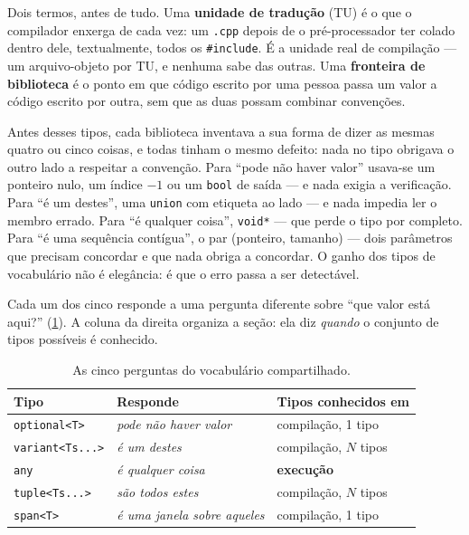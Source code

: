 Dois termos, antes de tudo. Uma \textbf{unidade de tradução} (TU) é o que o
compilador enxerga de cada vez: um \texttt{.cpp} depois de o pré-processador ter
colado dentro dele, textualmente, todos os \texttt{\#include}. É a unidade real
de compilação --- um arquivo-objeto por TU, e nenhuma sabe das outras. Uma
\textbf{fronteira de biblioteca} é o ponto em que código escrito por uma pessoa
passa um valor a código escrito por outra, sem que as duas possam combinar
convenções.

\begin{porque}
Antes desses tipos, cada biblioteca inventava a sua forma de dizer as mesmas
quatro ou cinco coisas, e todas tinham o mesmo defeito: nada no tipo obrigava o
outro lado a respeitar a convenção. Para ``pode não haver valor'' usava-se um
ponteiro nulo, um índice $-1$ ou um \texttt{bool} de saída --- e nada exigia a
verificação. Para ``é um destes'', uma \texttt{union} com etiqueta ao lado ---
e nada impedia ler o membro errado. Para ``é qualquer coisa'', \texttt{void*}
--- que perde o tipo por completo. Para ``é uma sequência contígua'', o par
(ponteiro, tamanho) --- dois parâmetros que precisam concordar e que nada obriga
a concordar. O ganho dos tipos de vocabulário não é elegância: é que o erro
passa a ser detectável.
\end{porque}

Cada um dos cinco responde a uma pergunta diferente sobre ``que valor está
aqui?'' (\cref{tab:vocab-perguntas}). A coluna da direita organiza a seção: ela
diz \emph{quando} o conjunto de tipos possíveis é conhecido.

\begin{table}[htbp]
\centering
\caption{As cinco perguntas do vocabulário compartilhado.}
\label{tab:vocab-perguntas}
\footnotesize
\begin{tabular}{@{}lll@{}}
\toprule
\textbf{Tipo} & \textbf{Responde} & \textbf{Tipos conhecidos em} \\
\midrule
\texttt{optional<T>}      & \emph{pode não haver valor}       & compilação, 1 tipo \\
\texttt{variant<Ts...>}   & \emph{é um destes}                & compilação, $N$ tipos \\
\texttt{any}              & \emph{é qualquer coisa}           & \textbf{execução} \\
\texttt{tuple<Ts...>}     & \emph{são todos estes}            & compilação, $N$ tipos \\
\texttt{span<T>}          & \emph{é uma janela sobre aqueles} & compilação, 1 tipo \\
\bottomrule
\end{tabular}
\end{table}

